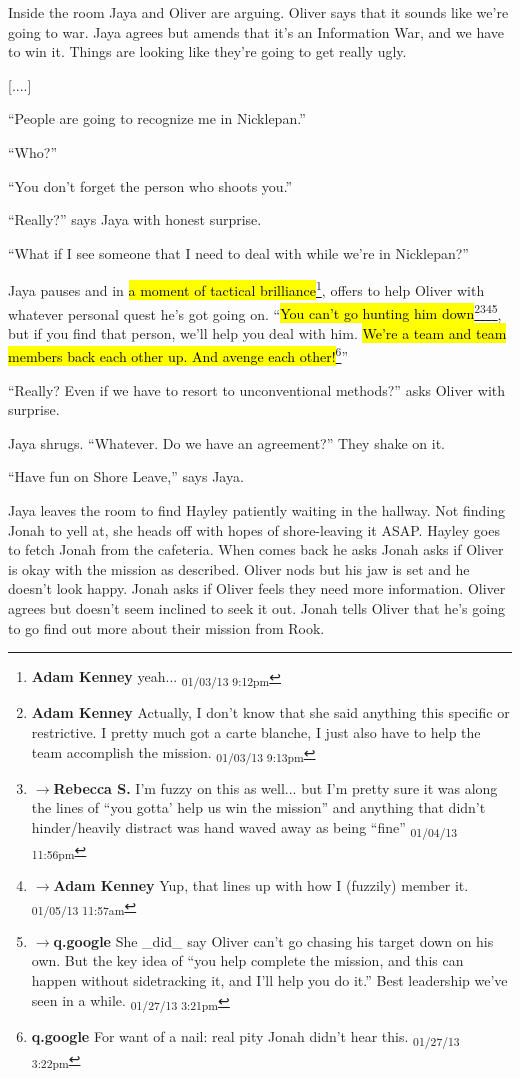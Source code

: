Inside the room Jaya and Oliver are arguing.  Oliver says that it sounds like we're going to war.  Jaya agrees but amends that it's an Information War, and we have to win it.  Things are looking like they're going to get really ugly.

 {[}....{]}

``People are going to recognize me in Nicklepan.''

``Who?''

``You don't forget the person who shoots you.''

``Really?'' says Jaya with honest surprise.

``What if I see someone that I need to deal with while we're in Nicklepan?''

Jaya pauses and in \hl{a moment of tactical brilliance}\footnote{\textbf{Adam Kenney }yeah... \textsubscript{01/03/13 9:12pm}}, offers to help Oliver with whatever personal quest he's got going on.  ``\hl{You can't go hunting him down}\footnote{\textbf{Adam Kenney }Actually, I don't know that she said anything this specific or restrictive.  I pretty much got a carte blanche, I just also have to help the team accomplish the mission. \textsubscript{01/03/13 9:13pm}}\footnote{$\rightarrow$\textbf{Rebecca S. }I'm fuzzy on this as well... but I'm pretty sure it was along the lines of ``you gotta' help us win the mission'' and anything that didn't hinder/heavily distract was hand waved away as being ``fine'' \textsubscript{01/04/13 11:56pm}}\footnote{$\rightarrow$\textbf{Adam Kenney }Yup, that lines up with how I (fuzzily) member it. \textsubscript{01/05/13 11:57am}}\footnote{$\rightarrow$\textbf{q.google }She \_did\_ say Oliver can't go chasing his target down on his own.  But the key idea of ``you help complete the mission, and this can happen without sidetracking it, and I'll help you do it.''  Best leadership we've seen in a while. \textsubscript{01/27/13 3:21pm}}, but if you find that person, we'll help you deal with him.  \hl{We're a team and team members back each other up. And avenge each other!}\footnote{\textbf{q.google }For want of a nail: real pity Jonah didn't hear this. \textsubscript{01/27/13 3:22pm}}''

``Really?  Even if we have to resort to unconventional methods?'' asks Oliver with surprise.

Jaya shrugs.  ``Whatever.  Do we have an agreement?''  They shake on it. 

``Have fun on Shore Leave,'' says Jaya.

Jaya leaves the room to find Hayley patiently waiting in the hallway.  Not finding Jonah to yell at, she heads off with hopes of shore-leaving it ASAP.  Hayley goes to fetch Jonah from the cafeteria.  When comes back he asks Jonah asks if Oliver is okay with the mission as described.  Oliver nods but his jaw is set and he doesn't look happy.  Jonah asks if Oliver feels they need more information.  Oliver agrees but doesn't seem inclined to seek it out.  Jonah tells Oliver that he's going to go find out more about their mission from Rook.


